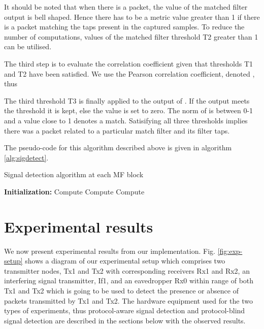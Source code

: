 \documentclass[journal]{IEEEtran}
\begin{document}
It should be noted that when there is a packet, the value of the matched filter output is bell shaped. Hence there has to be a metric value greater than 1 if there is a packet matching the taps present in the captured samples. To reduce the number of computations, values of the matched filter threshold T2 greater than 1 can be utilised.

The third step is to evaluate the correlation coefficient given that thresholds T1 and T2 have been satisfied. We use the Pearson correlation coefficient, denoted , thus

The third threshold T3 is finally applied to the output of . If the output meets the threshold it is kept, else the value is set to zero. The norm of  is between 0-1 and a value close to 1 denotes a match. Satisifying all three thresholds implies there was a packet related to a particular match filter and its filter taps.

The pseudo-code for this algorithm described above is given in algorithm \ref{alg:sigdetect}.

\begin{algorithm}
\caption{Signal detection algorithm at each MF block}
\label{alg:sigdetect}

\begin{algorithmic}
\STATE \textbf {Initialization:}
\STATE 
\STATE 
\STATE 
\WHILE {}
\IF {} 
        \STATE Compute 
        \STATE Compute 
        \IF {}
                \STATE Compute \
                \IF {}
                \STATE 
                \ENDIF
        \ELSE
                \STATE  
        \ENDIF
\ELSE
        \STATE 
        \STATE 
\ENDIF 
\ENDWHILE


\end{algorithmic}
\end{algorithm}


\section{Experimental results} \label{sec:results}

We now present experimental results from our implementation. Fig. \ref{fig:exp-setup} shows a diagram of our experimental setup which comprises two transmitter nodes, Tx1 and Tx2 with corresponding receivers Rx1 and Rx2, an interfering signal transmitter, If1, and an eavedropper Rx0 within range of both Tx1 and Tx2 which is going to be used to detect the presence or absence of packets transmitted by Tx1 and Tx2. The hardware equipment used for the two types of experiments, thus protocol-aware signal detection and protocol-blind signal detection are described in the sections below with the observed results.
\end{document}
